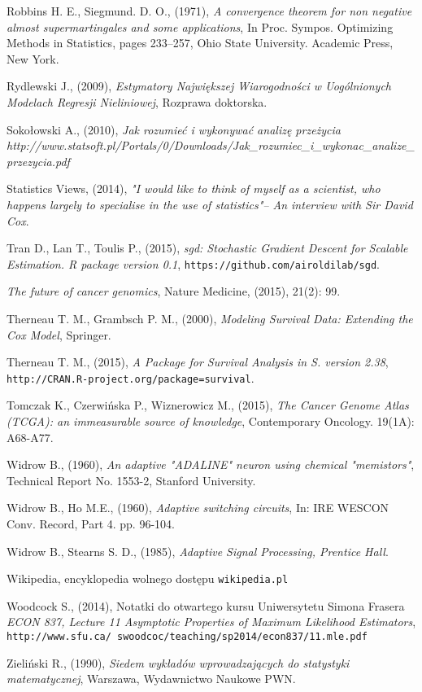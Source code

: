 \begin{thebibliography}{99}
 Robbins H. E., Siegmund. D. O., (1971), \textit{A convergence theorem for non negative almost supermartingales and some applications}, In Proc. Sympos. Optimizing Methods in Statistics, pages 233–257, Ohio State
University. Academic Press, New York.

 Rydlewski J., (2009), \textit{Estymatory Największej Wiarogodności w Uogólnionych Modelach Regresji Nieliniowej}, Rozprawa doktorska.

 Sokołowski A., (2010), \textit{Jak rozumieć i wykonywać analizę przeżycia} \textit{http://www.statsoft.pl/Portals/0/Downloads/Jak\_rozumiec\_i\_wykonac\_analize\_przezycia.pdf}

 Statistics Views, (2014), \textit{ "I would like to think of myself as a scientist, who happens largely to specialise in the use of statistics"– An interview with Sir David Cox}.

 Tran D., Lan T., Toulis P., (2015), \textit{sgd: Stochastic Gradient Descent for Scalable Estimation. R package version 0.1}, \texttt{https://github.com/airoldilab/sgd}.


 \textit{The future of cancer genomics}, Nature Medicine, (2015), 21(2): 99.

 Therneau T. M., Grambsch P. M., (2000), \textit{Modeling Survival Data: Extending the Cox Model}, Springer.

 Therneau T. M., (2015), \textit{A Package for Survival Analysis in S. version 2.38}, \texttt{http://CRAN.R-project.org/package=survival}.


 Tomczak K., Czerwińska P., Wiznerowicz M., (2015), \textit{The Cancer Genome Atlas (TCGA): an immeasurable source of knowledge}, Contemporary Oncology. 19(1A): A68-A77.

 Widrow B., (1960), \textit{An adaptive "ADALINE" neuron using chemical "memistors"}, Technical Report No. 1553-2, Stanford University.

 Widrow B., Ho M.E., (1960), \textit{Adaptive switching circuits}, In: IRE WESCON Conv.
Record, Part 4. pp. 96-104.

 Widrow B., Stearns S. D., (1985), \textit{Adaptive Signal Processing, Prentice Hall}.

 Wikipedia, encyklopedia wolnego dostępu \texttt{wikipedia.pl}

  Woodcock S., (2014), Notatki do otwartego kursu Uniwersytetu Simona Frasera \textit{ECON 837, Lecture 11 Asymptotic Properties of Maximum Likelihood Estimators}, \\ \texttt{http://www.sfu.ca/~swoodcoc/teaching/sp2014/econ837/11.mle.pdf}

 Zieliński R., (1990), \textit{Siedem wykładów wprowadzających do statystyki matematycznej}, Warszawa, Wydawnictwo Naukowe PWN.


\end{thebibliography}
